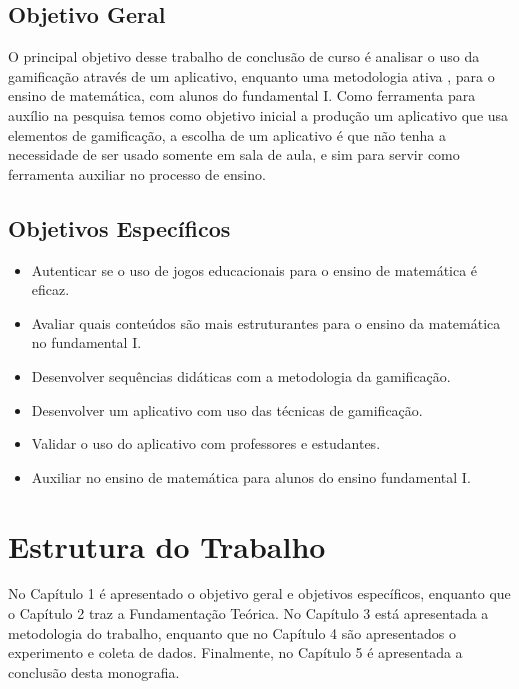 \subsection{Objetivo Geral}

 O principal objetivo desse trabalho de conclusão de curso é analisar o uso da gamificação através de um aplicativo,  enquanto uma metodologia ativa , para o ensino de matemática, com  alunos do fundamental I. Como ferramenta para auxílio na pesquisa temos como objetivo inicial a produção um aplicativo que usa elementos de gamificação, a escolha de um aplicativo é que não tenha a necessidade de ser usado somente em sala de aula, e sim para servir como ferramenta auxiliar no processo de ensino.


\subsection{Objetivos Específicos}

\begin{itemize}
\item{Autenticar se o uso de jogos educacionais para o ensino de matemática é eficaz.
}
\item {Avaliar quais conteúdos são mais estruturantes para o ensino da matemática no fundamental I.
} 
\item {Desenvolver sequências didáticas com a metodologia da gamificação.
 }  
\item {Desenvolver um aplicativo com uso das técnicas de gamificação.
}
\item {Validar o uso do aplicativo com professores e estudantes.
}
\item {Auxiliar no ensino de matemática para alunos do ensino fundamental I.
}
\end{itemize}

\section{Estrutura do Trabalho}

No Capítulo 1 é apresentado o objetivo geral e objetivos específicos, enquanto que o Capítulo 2 traz a Fundamentação Teórica. No Capítulo 3 está apresentada a metodologia do trabalho, enquanto que no Capítulo 4 são apresentados o experimento e coleta de dados. Finalmente, no Capítulo 5 é apresentada a conclusão desta monografia.


